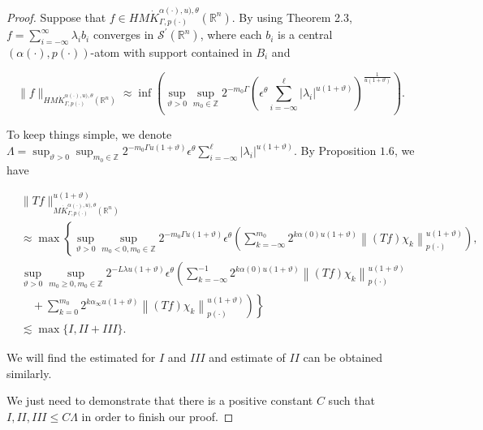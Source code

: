 \documentclass[oneside,reqno]{amsart}
\numberwithin{equation}{section}
\theoremstyle{definition}
\begin{document}
\begin{proof}
    



 Suppose that  $f \in  H {M \dot{K} ^{\alpha(\cdot),u),\theta}_{ \Gamma, p(\cdot)}(\mathbb{R}^n)}$. By using Theorem 2.3, $f=\sum_{i=-\infty}^{\infty} \lambda_{i} b_{i}$ converges in $\mathcal{S}^{\prime}\left(\mathbb{R}^{n}\right)$, where each $b_{i}$ is a central $(\alpha(\cdot), p(\cdot))$-atom with support contained in $B_{i}$ and


\begin{equation*}
\|f\|_ {H {M \dot{K} ^{\alpha(\cdot),u),\theta}_{ \Gamma, p(\cdot)}(\mathbb{R}^n)}} \approx \inf \left(\sup_{\vartheta>0 }\sup _{m_0\in  \mathbb{Z}} 2^{-m_0\Gamma}\left(\epsilon  ^\theta\sum_{i=-\infty}^{\ell }\left|\lambda_{i}\right|^{u(1+\vartheta)}\right)^{\frac{1}{u(1+\vartheta)}}\right) . \tag{73}
\end{equation*}


To keep things simple, we denote 
 $\Lambda=\sup_{\vartheta>0 }\sup _{m_0\in  \mathbb{Z}} 2^{-m_0\Gamma u(1+\vartheta)}\epsilon  ^\theta \sum_{i=-\infty}^{\ell }\left|\lambda_{i}\right|^{u(1+\vartheta)}$. By Proposition $1.6$, we have


\begin{align*}
& \|T f\|_{M \dot{K} ^{\alpha(\cdot),u),\theta}_{ \Gamma, p(\cdot)}(\mathbb{R}^n)}^{u(1+\vartheta)} \\
& \approx \max \left\{\sup_{\vartheta>0 }\sup _{m_0<0, m_0\in  \mathbb{Z}} 2^{-m_0\Gamma u(1+\vartheta)} \epsilon  ^\theta \left(\sum_{k=-\infty}^{m_0} 2^{k  \alpha(0) u(1+\vartheta)}\left\|(T f) \chi_{k}\right\|_{{p(\cdot)}}^{u(1+\vartheta)}\right),\right. \\
& \sup_{\vartheta>0 }\sup _{m_0\geq 0, m_0\in  \mathbb{Z}} 2^{-L \lambda u(1+\vartheta)} \epsilon  ^\theta \left(\sum_{k=-\infty}^{-1} 2^{k  \alpha(0) u(1+\vartheta)}\left\|(T f) \chi_{k}\right\|_{{p(\cdot)}}^{u(1+\vartheta)}\right. \\
& \left.\left.\quad+\sum_{k=0}^{m_0} 2^{k \alpha_\infty u(1+\vartheta)}\left\|(T f) \chi_{k}\right\|_{{p(\cdot)}}^{u(1+\vartheta)}\right)\right\} \\
& \lesssim \max \{I, I I+I I I\}. 
\end{align*}


We will find the estimated for $I$ and $III$ and estimate of $II$ can be obtained similarly. 


We just need to demonstrate that there is a positive constant $C$ such that $I, I I, I I I \leq C \Lambda$ in order to finish our proof.


\end{proof}
\end{document}
